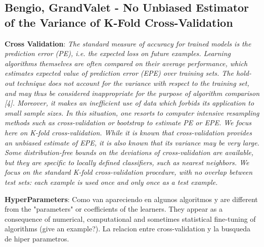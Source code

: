\subsection{Bengio, GrandValet - No Unbiased Estimator of the Variance of K-Fold Cross-Validation}
\textbf{Cross Validation}: 
\textit{The standard measure of accuracy for trained models is the prediction error (PE), i.e. the expected loss on future examples. Learning algorithms themselves are often compared on their average performance, which estimates expected value of prediction error (EPE) over training sets.
The hold-out technique does not account for the variance with respect to the training set, and may thus be considered inappropriate for the purpose of algorithm comparison [4]. Moreover, it makes an inefficient use of data which forbids its application to small sample sizes. In this situation, one resorts to computer intensive resampling methods such as cross-validation or bootstrap to estimate PE or EPE. We focus here on K-fold cross-validation. While it is known that cross-validation provides an unbiased estimate of EPE, it is also known that its variance may be very large.
Some distribution-free bounds on the deviations of cross-validation are available, but they are specific to locally defined classifiers, such as nearest neighbors.
We focus on the standard K-fold cross-validation procedure, with no overlap between test sets: each example is used once and only once as a test example.
}




\textbf{HyperParameters}:
Como van apareciendo en algunos algoritmos y are different from the "parameters" or coefficients of the learners. They appear as a consequence of numerical, computational and sometimes statistical fine-tuning of algorithms (give an example?). 
La relacion entre cross-validation y la busqueda de hiper parametros. 

\textit{}

\textit{}


